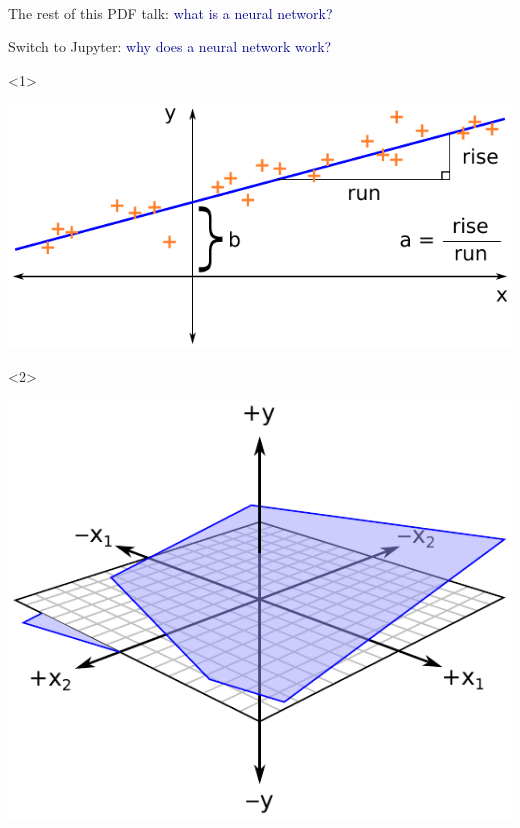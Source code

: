 \documentclass[aspectratio=169]{beamer}
\begin{document}
\begin{frame}{\mbox{ }}
\begin{center}
\LARGE
The rest of this PDF talk: \textcolor{darkblue}{what is a neural network?}

\vspace{1 cm}
Switch to Jupyter: \textcolor{darkblue}{why does a neural network work?}
\end{center}
\end{frame}

\begin{frame}{}
\vspace{0.25 cm}
\begin{onlyenv}<1>
\begin{center}
\includegraphics[width=0.4\linewidth]{img/equation-for-a-line.pdf}
\end{center}
\vspace{-1.5 cm}
\end{onlyenv}\begin{onlyenv}<2>
\begin{center}
\includegraphics[width=0.4\linewidth]{img/equation-for-a-plane.pdf}
\end{center}
\vspace{-1.75 cm}
\end{onlyenv}


\end{frame}
\end{document}
